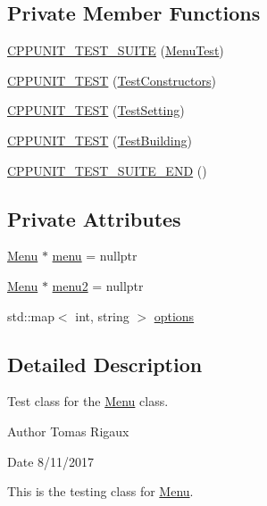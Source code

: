 \subsection*{Private Member Functions}
\begin{DoxyCompactItemize}
\item 
\hyperlink{classMenuTest_ab45183ab71d4ba80dc011c1c8644f174}{C\-P\-P\-U\-N\-I\-T\-\_\-\-T\-E\-S\-T\-\_\-\-S\-U\-I\-T\-E} (\hyperlink{classMenuTest}{Menu\-Test})
\item 
\hyperlink{classMenuTest_a24b434b2d0f375ed54fee29c0ac704ee}{C\-P\-P\-U\-N\-I\-T\-\_\-\-T\-E\-S\-T} (\hyperlink{classMenuTest_a8937223971935c31487f46a00d294e97}{Test\-Constructors})
\item 
\hyperlink{classMenuTest_a1cdba567656a3c9ab7056913dcc3c7bc}{C\-P\-P\-U\-N\-I\-T\-\_\-\-T\-E\-S\-T} (\hyperlink{classMenuTest_ab0a87d1e4ee856ccf3af3cc6663845c4}{Test\-Setting})
\item 
\hyperlink{classMenuTest_ac4f7a497c3b2ff88e841ebc4b4cee318}{C\-P\-P\-U\-N\-I\-T\-\_\-\-T\-E\-S\-T} (\hyperlink{classMenuTest_af74ddfe672fb68438b3e966c3736a763}{Test\-Building})
\item 
\hyperlink{classMenuTest_ae361a2aeef4a50756b043b8b658f9add}{C\-P\-P\-U\-N\-I\-T\-\_\-\-T\-E\-S\-T\-\_\-\-S\-U\-I\-T\-E\-\_\-\-E\-N\-D} ()
\end{DoxyCompactItemize}
\subsection*{Private Attributes}
\begin{DoxyCompactItemize}
\item 
\hyperlink{classMenu}{Menu} $\ast$ \hyperlink{classMenuTest_a1112471b20626234fa45958cce6ed8d5}{menu} = nullptr
\item 
\hyperlink{classMenu}{Menu} $\ast$ \hyperlink{classMenuTest_a9d994a71bc3d2d182f63030492aeb84d}{menu2} = nullptr
\item 
std\-::map$<$ int, string $>$ \hyperlink{classMenuTest_a49607805fcfaf8b080037d0a2b377e74}{options}
\end{DoxyCompactItemize}


\subsection{Detailed Description}
Test class for the \hyperlink{classMenu}{Menu} class. 

\begin{DoxyAuthor}{Author}
Tomas Rigaux 
\end{DoxyAuthor}
\begin{DoxyDate}{Date}
8/11/2017
\end{DoxyDate}
This is the testing class for \hyperlink{classMenu}{Menu}. 

